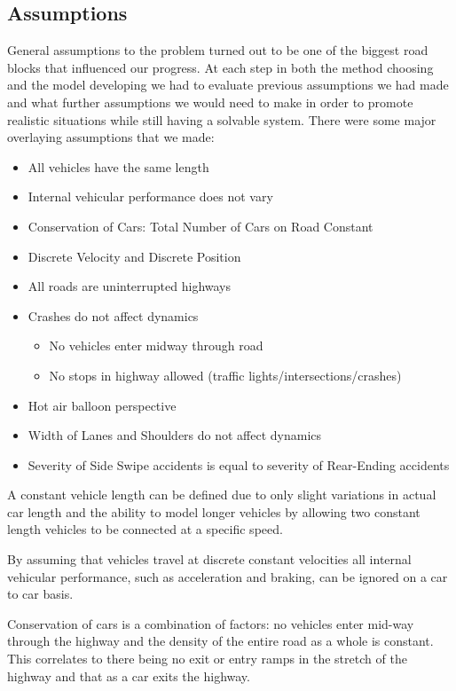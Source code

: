 \documentclass{amsart}
\begin{document}
	\subsection{Assumptions}
		General assumptions to the problem turned out to be one of the biggest road blocks that influenced our progress.  At each step in both the method choosing and the model developing we had to evaluate previous assumptions we had made and what further assumptions we would need to make in order to promote realistic situations while still having a solvable system.  There were some major overlaying assumptions that we made:
		\begin{itemize}
			\item 	All vehicles have the same length 
			\item 	Internal vehicular performance does not vary
			\item 	Conservation of Cars: Total Number of Cars on Road Constant
			\item  	Discrete Velocity and Discrete Position
			\item  	All roads are uninterrupted highways
			\item   Crashes do not affect dynamics
				\begin{itemize}
					\item 	No vehicles enter midway through road
					\item 	No stops in highway allowed (traffic lights/intersections/crashes) 
				\end{itemize}
			\item  Hot air balloon perspective
			\item  Width of Lanes and Shoulders do not affect dynamics
			\item 	Severity of Side Swipe accidents is equal to severity of Rear-Ending accidents			
		\end{itemize}
		 A constant vehicle length can be defined due to only slight variations in actual car length and the ability to model longer vehicles by allowing two constant length vehicles to be connected at a specific speed.

		By assuming that vehicles travel at discrete constant velocities all internal vehicular performance, such as acceleration and braking, can be ignored on a car to car basis. 

	 	 Conservation of cars is a combination of factors: no vehicles enter mid-way through the highway and the density of the entire road as a whole is constant.  This correlates to there being no exit or entry ramps in the stretch of the highway and that as a car exits the highway.	
\end{document}
